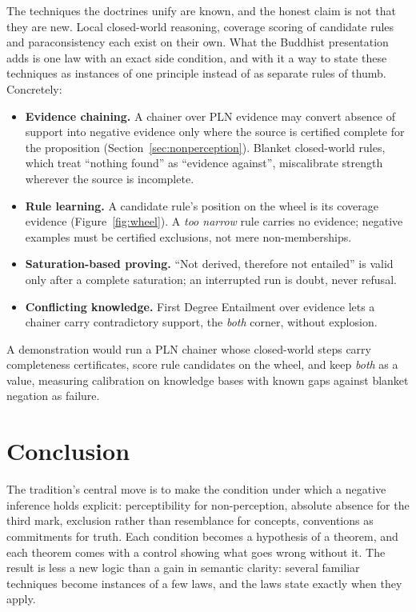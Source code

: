 \documentclass[11pt]{article}
\theoremstyle{plain}
\theoremstyle{definition}
\begin{document}
The techniques the doctrines unify are known, and the honest claim is not that they are new.
Local closed-world reasoning, coverage scoring of candidate rules and paraconsistency each
exist on their own. What the Buddhist presentation adds is one law with an exact side
condition, and with it a way to state these techniques as instances of one principle instead
of as separate rules of thumb. Concretely:
\begin{itemize}
\item \textbf{Evidence chaining.} A chainer over PLN evidence may convert absence of support
into negative evidence only where the source is certified complete for the proposition
(Section~\ref{sec:nonperception}). Blanket closed-world rules, which treat ``nothing found''
as ``evidence against'', miscalibrate strength wherever the source is incomplete.
\item \textbf{Rule learning.} A candidate rule's position on the wheel is its coverage evidence
(Figure~\ref{fig:wheel}). A \emph{too narrow} rule carries no evidence; negative examples must
be certified exclusions, not mere non-memberships.
\item \textbf{Saturation-based proving.} ``Not derived, therefore not entailed'' is valid only
after a complete saturation; an interrupted run is doubt, never refusal.
\item \textbf{Conflicting knowledge.} First Degree Entailment over evidence lets a chainer carry
contradictory support, the \emph{both} corner, without explosion.
\end{itemize}
A demonstration would run a PLN chainer whose closed-world steps carry completeness
certificates, score rule candidates on the wheel, and keep \emph{both} as a value, measuring
calibration on knowledge bases with known gaps against blanket negation as failure.

\section{Conclusion}

The tradition's central move is to make the condition under which a negative inference holds
explicit: perceptibility for non-perception, absolute absence for the third mark, exclusion
rather than resemblance for concepts, conventions as commitments for truth. Each condition
becomes a hypothesis of a theorem, and each theorem comes with a control showing what goes
wrong without it. The result is less a new logic than a gain in semantic clarity: several
familiar techniques become instances of a few laws, and the laws state exactly when they
apply.
\end{document}
